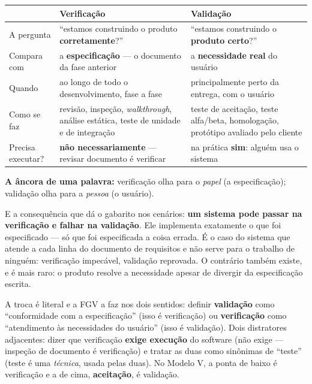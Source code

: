 \begin{conceito}
\begin{center}
\begin{tabular}{@{}p{2.6cm}p{4.4cm}p{4.6cm}@{}}
\toprule
& \textbf{Verificação} & \textbf{Validação} \\
\midrule
A pergunta & ``estamos construindo o produto \textbf{corretamente}?'' &
``estamos construindo o \textbf{produto certo}?'' \\
Compara com & a \textbf{especificação} --- o documento da fase anterior &
a \textbf{necessidade real} do usuário \\
Quando & ao longo de todo o desenvolvimento, fase a fase & principalmente
perto da entrega, com o usuário \\
Como se faz & revisão, inspeção, \emph{walkthrough}, análise estática, teste
de unidade e de integração & teste de aceitação, teste alfa/beta,
homologação, protótipo avaliado pelo cliente \\
Precisa executar? & \textbf{não necessariamente} --- revisar documento é
verificar & na prática \textbf{sim}: alguém usa o sistema \\
\bottomrule
\end{tabular}
\end{center}

\textbf{A âncora de uma palavra:} verificação olha para o \emph{papel}
(a especificação); validação olha para a \emph{pessoa} (o usuário).

E a consequência que dá o gabarito nos cenários: \textbf{um sistema pode
passar na verificação e falhar na validação}. Ele implementa exatamente o que
foi especificado --- só que foi especificada a coisa errada. É o caso do
sistema que atende a cada linha do documento de requisitos e não serve para o
trabalho de ninguém: verificação impecável, validação reprovada. O contrário
também existe, e é mais raro: o produto resolve a necessidade apesar de
divergir da especificação escrita.
\end{conceito}

\begin{pegadinha}
A troca é literal e a FGV a faz nos dois sentidos: definir \textbf{validação}
como ``conformidade com a especificação'' (isso é verificação) ou
\textbf{verificação} como ``atendimento às necessidades do usuário'' (isso é
validação). Dois distratores adjacentes: dizer que verificação
\textbf{exige execução} do software (não exige --- inspeção de documento é
verificação) e tratar as duas como sinônimas de ``teste'' (teste é uma
\emph{técnica}, usada pelas duas). No Modelo V, a ponta de baixo é
verificação e a de cima, \textbf{aceitação}, é validação.
\end{pegadinha}

